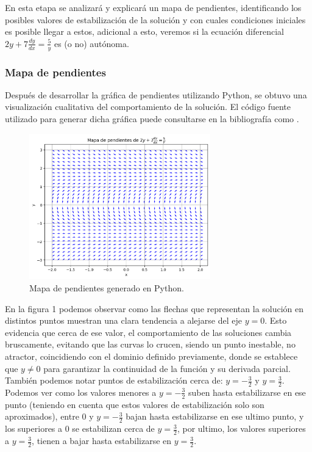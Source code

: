 \documentclass{article}
\begin{document}
En esta etapa se analizará y explicará un mapa de pendientes, identificando los posibles valores de estabilización de la solución y con cuales condiciones iniciales es posible llegar a estos, adicional a esto, veremos si la ecuación diferencial  \( 2y + 7\frac{dy}{dx} = \frac{5}{y} \) es (o no) autónoma.

\subsubsection*{Mapa de pendientes}

Después de desarrollar la gráfica de pendientes utilizando Python, se obtuvo una visualización cualitativa del comportamiento de la solución. El código fuente utilizado para generar dicha gráfica puede consultarse en la bibliografía como \cite{codigo_mapaPendiente}.

\begin{figure}[H]
    \centering
    \includegraphics[width=0.7\textwidth]{MapaDePendientes.png}
    \caption{Mapa de pendientes generado en Python.}
    \label{fig:pendientes}
\end{figure}

En la figura 1 podemos observar como las flechas que representan la solución en distintos puntos muestran una clara tendencia a alejarse del eje \( y = 0 \). Esto evidencia que cerca de ese valor, el comportamiento de las soluciones cambia bruscamente, evitando que las curvas lo crucen, siendo un punto inestable, no atractor, coincidiendo con el dominio definido previamente, donde se establece que \(y \neq 0\) para garantizar la continuidad de la función y su derivada parcial. También podemos notar puntos de estabilización cerca de: \(y = -\frac{3}{2}\) y \(y = \frac{3}{2}\). Podemos ver como los valores menores a \(y = -\frac{3}{2}\) suben hasta estabilizarse en ese punto (teniendo en cuenta que estos valores de estabilización solo son aproximados), entre 0 y \(y = -\frac{3}{2}\) bajan hasta estabilizarse en ese ultimo punto, y los superiores a 0 se estabilizan cerca de \(y = \frac{3}{2}\), por ultimo, los valores superiores a \(y = \frac{3}{2}\), tienen a bajar hasta estabilizarse en \(y = \frac{3}{2}\).
\end{document}
